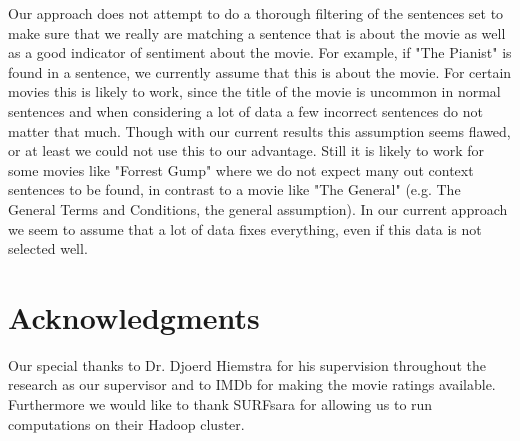 \documentclass{acm_proc_article-sp}
\begin{document}
Our approach does not attempt to do a thorough filtering of the sentences set to make sure that we really are matching a sentence that is about the movie as well as a good indicator of sentiment about the movie. For example, if "The Pianist" is found in a sentence, we currently assume that this is about the movie. For certain movies this is likely to work, since the title of the movie is uncommon in normal sentences and when considering a lot of data a few incorrect sentences do not matter that much. Though with our current results this assumption seems flawed, or at least we could not use this to our advantage. Still it is likely to work for some movies like "Forrest Gump" where we do not expect many out context sentences to be found, in contrast to a movie like "The General" (e.g. The General Terms and Conditions, the general assumption). In our current approach we seem to assume that a lot of data fixes everything, even if this data is not selected well.

\section{Acknowledgments}
Our special thanks to Dr. Djoerd Hiemstra for his supervision throughout the research as our supervisor and to IMDb for making the movie ratings available. Furthermore we would like to thank SURFsara for allowing us to run computations on their Hadoop cluster.


%

%
%

\balancecolumns
\end{document}
